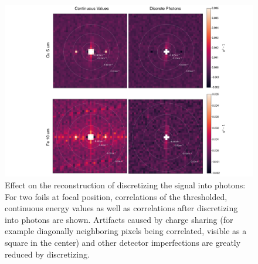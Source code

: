 \begin{figure}
	\includegraphics[width=\linewidth]{images/foil_photonmodes.pdf}

	\caption[Effect of discretizing the signal into photons]{Effect on the reconstruction of discretizing the signal into photons: For two foils at focal position,  correlations of the thresholded, continuous energy values as well as correlations after discretizing into photons are shown. Artifacts caused by charge sharing (for example diagonally neighboring pixels being correlated, visible as a square in the center) and other detector imperfections are greatly reduced by discretizing.}
	\label{fig:foil_photonmodes}
\end{figure}

